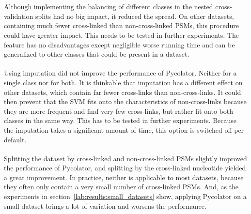 \\\\
Although implementing the balancing of different classes in the nested cross-validation splits had no big impact, it reduced the spread. On other datasets, containing much fewer cross-linked than non-cross-linked PSMs, this procedure could have greater impact. This needs to be tested in further experiments. The feature has no disadvantages except negligible worse running time and can be generalized to other classes that could be present in a dataset.\\\\
Using imputation did not improve the performance of Pycolator. Neither for a single class nor for both. It is thinkable that imputation has a different effect on other datasets, which contain far fewer cross-links than non-cross-links. It could then prevent that the SVM fits onto the characteristics of non-cross-links because they are more frequent and find very few cross-links, but rather fit onto both classes in the same way. This has to be tested in further experiments. Because the imputation takes a significant amount of time, this option is switched off per default.\\\\
Splitting the dataset by cross-linked and non-cross-linked PSMs slightly improved the performance of Pycolator, and splitting by the cross-linked nucleotide yielded a great improvement. In practice, neither is applicable to most datasets, because they often only contain a very small number of cross-linked PSMs. And, as the experiments in section~\ref{lab:results:small_datasets} show, applying Pycolator on a small dataset brings a lot of variation and worsens the performance.\\
